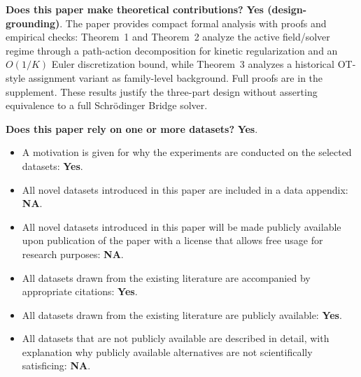 \documentclass[letterpaper]{article}
\begin{document}
\noindent\textbf{Does this paper make theoretical contributions?} \textbf{Yes (design-grounding)}. The paper provides compact formal analysis with proofs and empirical checks: Theorem~1 and Theorem~2 analyze the active field/solver regime through a path-action decomposition for kinetic regularization and an $O(1/K)$ Euler discretization bound, while Theorem~3 analyzes a historical OT-style assignment variant as family-level background. Full proofs are in the supplement. These results justify the three-part design without asserting equivalence to a full Schr\"odinger Bridge solver.

\noindent\textbf{Does this paper rely on one or more datasets?} \textbf{Yes}.
\begin{itemize}
\item A motivation is given for why the experiments are conducted on the selected datasets: \textbf{Yes}.
\item All novel datasets introduced in this paper are included in a data appendix: \textbf{NA}.
\item All novel datasets introduced in this paper will be made publicly available upon publication of the paper with a license that allows free usage for research purposes: \textbf{NA}.
\item All datasets drawn from the existing literature are accompanied by appropriate citations: \textbf{Yes}.
\item All datasets drawn from the existing literature are publicly available: \textbf{Yes}.
\item All datasets that are not publicly available are described in detail, with explanation why publicly available alternatives are not scientifically satisficing: \textbf{NA}.
\end{itemize}
\end{document}
